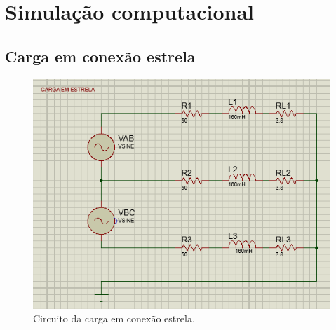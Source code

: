\documentclass[a4paper,12pt,oneside,openany,table,xcdraw]{article}
\begin{document}
\newpage
\section{Simulação computacional} %
\subsection{Carga em conexão estrela}
\begin{figure}[H]
\centering
\captionsetup{font=scriptsize}
\includegraphics[width=14cm]{sim1}
\caption{Circuito da carga em conexão estrela.}
\label{sim1}
\end{figure}
\end{document}
